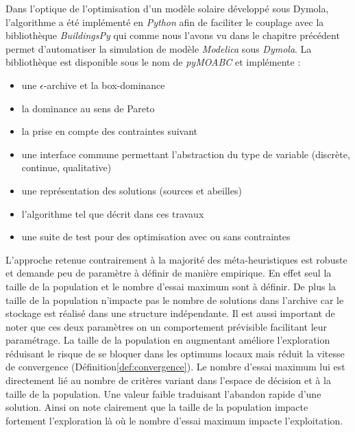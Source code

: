 Dans l’optique de l’optimisation d’un modèle solaire développé sous Dymola, l’algorithme
a été implémenté en \emph{Python} afin de faciliter le couplage avec la bibliothèque
\emph{BuildingsPy} qui comme nous l’avons vu dans le chapitre précédent permet d’automatiser
la simulation de modèle \emph{Modelica} sous \emph{Dymola}. La bibliothèque est
disponible sous le nom de \emph{pyMOABC} et implémente :
\begin{itemize}
  \item une $\epsilon$-archive et la box-dominance
  \item la dominance au sens de Pareto
  \item la prise en compte des contraintes suivant \cite{Woldesenbet20073077}
  \item une interface commune permettant l’abstraction du type de variable (discrète, continue, qualitative)
  \item une représentation des solutions (sources et abeilles)
  \item l’algorithme tel que décrit dans ces travaux
  \item une suite de test pour des optimisation avec ou sans contraintes
\end{itemize}

L’approche retenue contrairement à la majorité des méta-heuristiques est robuste et demande
peu de paramètre à définir de manière empirique. En effet seul la taille de la population
et le nombre d’essai maximum sont à définir. De plus la taille de la population
n’impacte pas le nombre de solutions dans l’archive car le stockage est réalisé dans
une structure indépendante. Il est aussi important de noter que ces deux paramètres
on un comportement prévisible facilitant leur paramétrage. La
taille de la population en augmentant améliore l’exploration réduisant le risque
de se bloquer dans les optimums locaux mais réduit la vitesse de convergence (Définition\ref{def:convergence}).
Le nombre d’essai maximum lui est directement lié au nombre de critères variant
dans l’espace de décision et à la taille de la population. Une valeur faible traduisant
l’abandon rapide d’une solution. Ainsi on note clairement que la taille de la population
impacte fortement l’exploration là où le nombre d’essai maximum impacte l’exploitation.

